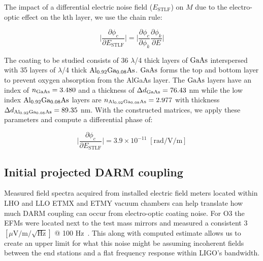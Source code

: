 \noindent The impact of a differential electric noise field ($E_\mathrm{STLF}$) on $M$ due to the electro-optic effect on the kth layer, we use the chain rule:

\begin{equation}
	\bigg| \frac{\partial \phi_c}{\partial  E_\mathrm{STLF}} \bigg| =  \bigg| \frac{\partial \phi_c}{\partial \phi_k}  \frac{\partial \phi_k}{\partial E} \bigg|
\end{equation}

The coating to be studied consists of 36 $\lambda$/4  thick layers of $\mathrm{GaAs}$ interspersed with 35 layers of $\lambda$/4 thick $\mathrm{Al_{0.92}Ga_{0.08}As}$. $\mathrm{GaAs}$ forms the top and bottom layer to prevent oxygen absorption from the AlGaAs layer. The $\mathrm{GaAs}$ layers have an index of $n_{\mathrm{GaAs}} = 3.480$ and a thickness of $\Delta d_{\mathrm{GaAs}} = 76.43$ nm while the low index $\mathrm{Al_{0.92}Ga_{0.08}As}$ layers are $n_{\mathrm{Al_{0.92}Ga_{0.08}As}} = 2.977$ with thickness $\Delta d_{\mathrm{Al_{0.92}Ga_{0.08}As}} = 89.35$ nm. With the constructed matrices, we apply these parameters and compute a differential phase of:

\begin{equation}
	\bigg| \frac{\partial \phi_c}{\partial  E_\mathrm{STLF}} \bigg|  = 3.9 \times 10^{-11}\; [\mathrm{rad}/\mathrm{V}/\mathrm{m}]      
\end{equation}



\subsection{Initial projected DARM coupling}
Measured field spectra acquired from installed electric field meters located within LHO and LLO ETMX and ETMY vacuum chambers can help translate how much DARM coupling can occur from electro-optic coating noise. For O3 the EFMs were located next to the test mass mirrors and measured a consistent 3 $[\mu \mathrm{V} / \mathrm{m} / \sqrt{\mathrm{Hz}}]$ @ 100 Hz~\cite{buikema:2020}. This along with computed estimate allows us to create an upper limit for what this noise might be assuming incoherent fields between the end stations and a flat frequency response within LIGO's bandwidth.


